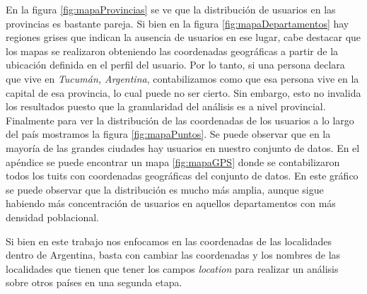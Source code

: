En la figura \ref{fig:mapaProvincias} se ve que la distribución de usuarios en las provincias es bastante pareja. Si bien en la figura \ref{fig:mapaDepartamentos} hay regiones grises que indican la ausencia de usuarios en ese lugar, cabe destacar que los mapas se realizaron obteniendo las coordenadas geográficas a partir de la ubicación definida en el perfil del usuario. Por lo tanto, si una persona declara que vive en \textit{Tucumán, Argentina}, contabilizamos como que esa persona vive en la capital de esa provincia, lo cual puede no ser cierto. Sin embargo, esto no invalida los resultados puesto que la granularidad del análisis es a nivel provincial. Finalmente para ver la distribución de las coordenadas de los usuarios a lo largo del país mostramos la figura \ref{fig:mapaPuntos}. Se puede observar que en la mayoría de las grandes ciudades hay usuarios en nuestro conjunto de datos. En el apéndice se puede encontrar un mapa \ref{fig:mapaGPS} donde se contabilizaron todos los tuits con coordenadas geográficas del conjunto de datos. En este gráfico se puede observar que la distribución es mucho más amplia, aunque sigue habiendo más concentración de usuarios en aquellos departamentos con más densidad poblacional.

Si bien en este trabajo nos enfocamos en las coordenadas de las localidades dentro de Argentina, basta con cambiar las coordenadas y los nombres de las localidades que tienen que tener los campos \textit{location} para realizar un análisis sobre otros países en una segunda etapa.


